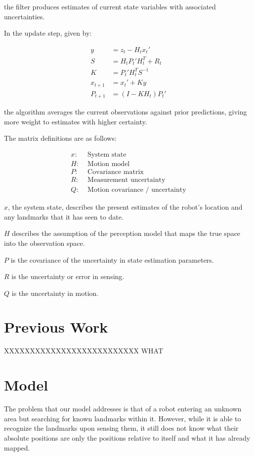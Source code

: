 \documentclass[prodmode,acmtecs]{acmsmall} %
\begin{document}
the filter produces estimates of current state variables with associated uncertainties.

In the update step, given by:

\begin{align*}
    y &= z_t - H_t x_t' \\
    S &= H_t P_t' H^T_t + R_t \\
    K &= P_t' H^T_t S^{-1} \\
    x_{t+1} &= x_t' + Ky \\
    P_{t+1} &= (I - K H_t) P_t'
\end{align*}

the algorithm averages the current observations against prior predictions, giving more weight to estimates with higher certainty.

The matrix definitions are as follows:

\begin{align*}
    x:& \text{ System state}\\
    H:& \text{ Motion model}\\
    P:& \text{ Covariance matrix}\\
    R:& \text{ Measurement uncertainty}\\
    Q:& \text{ Motion covariance / uncertainty}
\end{align*}

$x$, the system state, describes the present estimates of the robot's location and any landmarks that it has seen to date.

$H$ describes the assumption of the perception model that maps the true space into the observation space.

$P$ is the covariance of the uncertainty in state estimation parameters.

$R$ is the uncertainty or error in sensing.

$Q$ is the uncertainty in motion.


\section{Previous Work}

XXXXXXXXXXXXXXXXXXXXXXXXXX WHAT



\section{Model}

The problem that our model addresses is that of a robot entering an unknown area but searching for known landmarks within it.  However, while it is able to recognize the landmarks upon sensing them, it still does not know what their absolute positions are \- only the positions relative to itself and what it has already mapped.
\end{document}
